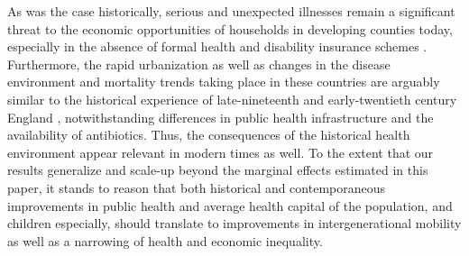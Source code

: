\documentclass[12pt,english]{article}
\begin{document}
As was the case historically, serious and unexpected illnesses remain a significant threat to the economic opportunities of households in developing counties today, especially in the absence of formal health and disability insurance schemes \citep{Gertler2002}. Furthermore, the rapid urbanization as well as changes in the disease environment and mortality trends taking place in these countries \citep{Fogel2004,Floud2011,CurrieVogl2013} are arguably similar to the historical experience of late-nineteenth and early-twentieth century England \citep{Mercer2014}, notwithstanding differences in public health infrastructure and the availability of antibiotics. Thus, the consequences of the historical health environment appear relevant in modern times as well. To the extent that our results generalize and scale-up beyond the marginal effects estimated in this paper, it stands to reason that both historical and contemporaneous improvements in public health and average health capital of the population, and children especially, should translate to improvements in intergenerational mobility as well as a narrowing of health and economic inequality. 


\newpage
\begin{singlespace}
    
\end{singlespace}



\newpage
\FloatBarrier
\end{document}
